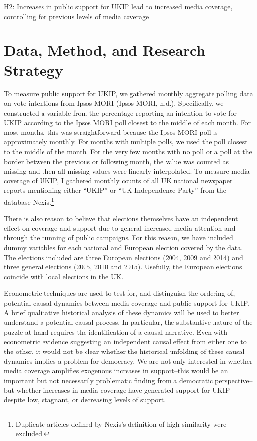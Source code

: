 \documentclass[12pt,article]{article}
\let\rmarkdownfootnote\footnote%
\def\footnote{\protect\rmarkdownfootnote}
\begin{document}
H2: Increases in public support for UKIP lead to increased media
coverage, controlling for previous levels of media coverage

\section{Data, Method, and Research
Strategy}\label{data-method-and-research-strategy}

To measure public support for UKIP, we gathered monthly aggregate
polling data on vote intentions from Ipsos MORI (Ipsos-MORI, n.d.).
Specifically, we constructed a variable from the percentage reporting an
intention to vote for UKIP according to the Ipsos MORI poll closest to
the middle of each month. For most months, this was straightforward
because the Ipsos MORI poll is approximately monthly. For months with
multiple polls, we used the poll closest to the middle of the month. For
the very few months with no poll or a poll at the border between the
previous or following month, the value was counted as missing and then
all missing values were linearly interpolated. To measure media coverage
of UKIP, I gathered monthly counts of all UK national newspaper reports
mentioning either ``UKIP'' or ``UK Independence Party'' from the
database
Nexis.\footnote{Duplicate articles defined by Nexis's definition of high similarity were excluded.}

There is also reason to believe that elections themselves have an
independent effect on coverage and support due to general increased
media attention and through the running of public campaigns. For this
reason, we have included dummy variables for each national and European
election covered by the data. The elections included are three European
elections (2004, 2009 and 2014) and three general elections (2005, 2010
and 2015). Usefully, the European elections coincide with local
elections in the UK.

Econometric techniques are used to test for, and distinguish the
ordering of, potential causal dynamics between media coverage and public
support for UKIP. A brief qualitative historical analysis of these
dynamics will be used to better understand a potential causal process.
In particular, the substantive nature of the puzzle at hand requires the
identification of a causal narrative. Even with econometric evidence
suggesting an independent causal effect from either one to the other, it
would not be clear whether the historical unfolding of these causal
dynamics implies a problem for democracy. We are not only interested in
whether media coverage amplifies exogenous increases in support--this
would be an important but not necessarily problematic finding from a
democratic perspective--but whether increases in media coverage have
generated support for UKIP despite low, stagnant, or decreasing levels
of support.
\end{document}
